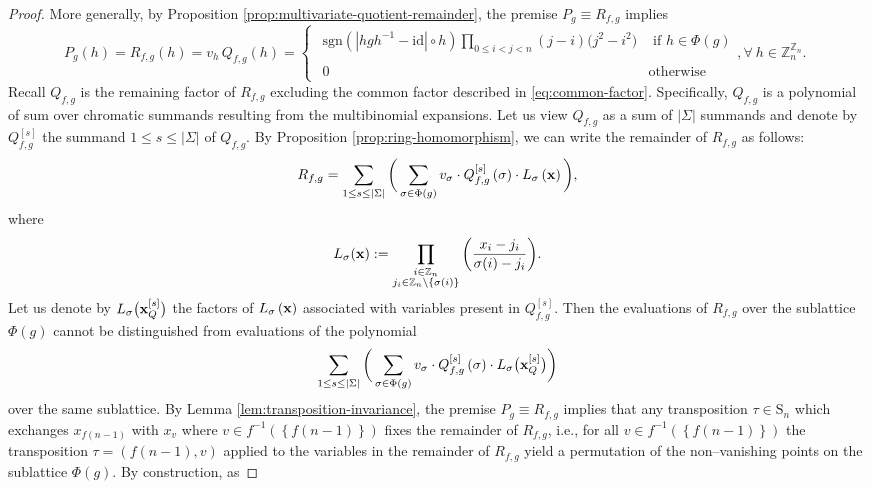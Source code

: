 \begin{proof}
More generally, by Proposition \ref{prop:multivariate-quotient-remainder}, the premise $P_{g}\equiv R_{f,g}$ implies 
\begin{equation}
P_{g}(h)=R_{f,g}\left(h\right)=v_{h}\,Q_{f,g}\left(h\right)=\begin{cases}
\begin{array}{cc}
\text{sgn}(\left|hgh^{-1}-\text{id}\right|\circ h)\underset{0\le i<j<n}{\prod}(j-i)\big(j^{2}-i^{2}) & \text{ if }h\in\Phi(g)\\
\\
0 & \text{otherwise}
\end{array},\forall\:h\in\mathbb{Z}_{n}^{\mathbb{Z}_{n}}.\end{cases}
\end{equation}
Recall $Q_{f,g}$ is the remaining factor of $R_{f,g}$ excluding the common factor described in \eqref{eq:common-factor}. Specifically, $Q_{f,g}$ is a polynomial of sum over chromatic summands resulting from the multibinomial expansions.  Let us view $Q_{f,g}$ as a sum of $|\Sigma|$ summands and denote by $Q_{f, g}^{\left[s\right]}$ the summand $1 \leq s \leq |\Sigma|$ of $Q_{f,g}$. By Proposition \ref{prop:ring-homomorphism}, we can write the remainder of $R_{f,g}$ as follows:
\begin{align*}
R_{f,g}=\sum_{1\leq s\leq\left|\Sigma\right|}\bigg(\sum_{\sigma\in\Phi(g)}v_{\sigma}\cdot Q_{f,g}^{\left[s\right]}\left(\sigma\right)\cdot L_{\sigma}\left({\bf x}\right)\bigg),
\end{align*}
where
\[
L_{\sigma}({\bf x}):=\prod_{\substack{i\in\mathbb{Z}_{n}\\
j_{i}\in\mathbb{Z}_{n}\setminus\{\sigma(i)\}
}
}\bigg(\frac{x_{i}-j_{i}}{\sigma(i)-j_{i}}\bigg).
\]
Let us denote by ${L_{{\sigma}}\big({\bf x}_{Q}^{\left[s\right]}\big)}$ the factors of $L_{\sigma}\left({\bf x}\right)$ associated with variables present in $Q_{f,g}^{\left[s\right]}$. Then the evaluations of $R_{f,g}$ over the sublattice  $\Phi(g)$  cannot be distinguished from evaluations of the polynomial
 \[
 \sum_{1\leq s\leq\left|\Sigma\right|}\bigg(\sum_{\sigma\in\Phi(g)}v_{\sigma}\cdot Q_{f,g}^{\left[s\right]}\left(\sigma\right)\cdot L_{\sigma}\big({\bf x}_{Q}^{\left[s\right]}\big)\bigg)
 \] 
over the same sublattice. By Lemma \ref{lem:transposition-invariance}, the premise $P_{g}\equiv R_{f,g}$ 
implies that any transposition $\tau\in\text{S}_{n}$ which exchanges
$x_{f(n-1)}$ with $x_{v}$ where $v\in f^{-1}\left(\left\{ f\left(n-1\right)\right\} \right)$
fixes the remainder of $R_{f,g}$,
i.e., for all $v \in f^{-1}\left(\left\{ f\left(n-1\right)\right\} \right)$ the transposition $\tau=\left( f(n-1), v\right)$ applied to the variables in the remainder of $R_{ f, g}$ yield a permutation of the non--vanishing points on the sublattice $\Phi(g)$. By construction, as

\end{proof}
